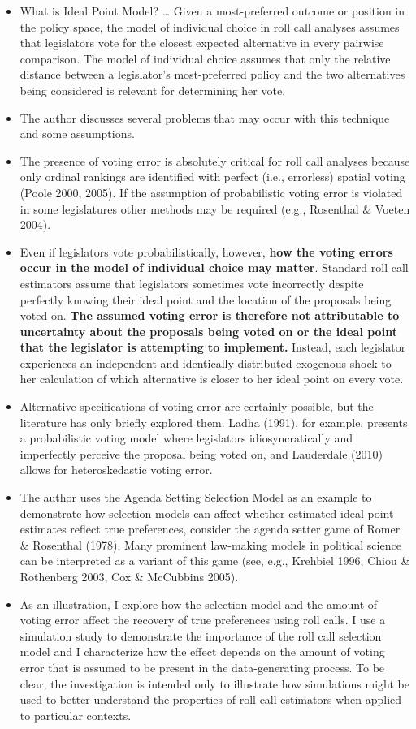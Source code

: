 \documentclass[a4paper,12pt]{article}
\begin{document}
\begin{enumerate}
\begin{itemize}
\item What is Ideal Point Model? … Given a most-preferred outcome or position in the policy space, the model of individual choice in roll call analyses assumes that legislators vote for the closest expected alternative in every pairwise comparison. The model of individual choice assumes that only the relative distance between a legislator’s most-preferred policy and the two alternatives being considered is relevant for determining her vote.  
\item The author discusses several problems that may occur with this technique and some assumptions.  
\item The presence of voting error is absolutely critical for roll call analyses because only ordinal rankings are identified with perfect (i.e., errorless) spatial voting (Poole 2000, 2005). If the assumption of probabilistic voting error is violated in some legislatures other methods may be required (e.g., Rosenthal \& Voeten 2004).
\item Even if legislators vote probabilistically, however, \textbf{how the voting errors occur in the model of individual choice may matter}. Standard roll call estimators assume that legislators sometimes vote incorrectly despite perfectly knowing their ideal point and the location of the proposals being voted on. \textbf{The assumed voting error is therefore not attributable to uncertainty about the proposals being voted on or the ideal point that the legislator is attempting to implement.}  Instead, each legislator experiences an independent and identically distributed exogenous shock to her calculation of which alternative is closer to her ideal point on every vote.
\item Alternative specifications of voting error are certainly possible, but the literature has only briefly explored them. Ladha (1991), for example, presents a probabilistic voting model where legislators idiosyncratically and imperfectly perceive the proposal being voted on, and Lauderdale (2010) allows for heteroskedastic voting error.
\item The author uses the Agenda Setting Selection Model as an example to demonstrate how selection models can affect whether estimated ideal point estimates reflect true preferences, consider the agenda setter game of Romer \& Rosenthal (1978). Many prominent law-making models in political science can be interpreted as a variant of this game (see, e.g., Krehbiel 1996, Chiou \& Rothenberg 2003, Cox \& McCubbins 2005). 
\item As an illustration, I explore how the selection model and the amount of voting error affect the recovery of true preferences using roll calls. I use a simulation study to demonstrate the importance of the roll call selection model and I characterize how the effect depends on the amount of voting error that is assumed to be present in the data-generating process. To be clear, the investigation is intended only to illustrate how simulations might be used to better understand the properties of roll call estimators when applied to particular contexts. 

\end{itemize}
\end{enumerate}
\end{document}
